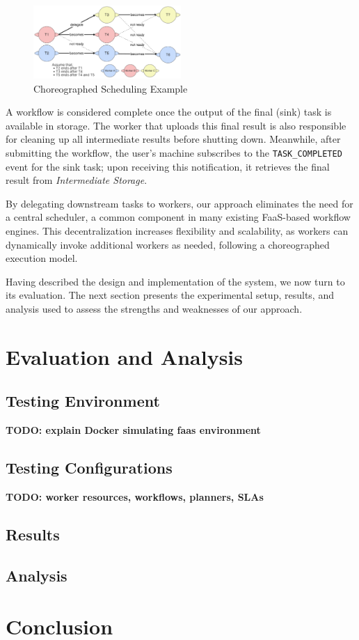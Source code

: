 \documentclass[conference]{IEEEtran}
\begin{document}
\begin{figure}[h]
    \centering
    \includegraphics[width=0.5\textwidth]{figures/choreographed_execution_example.png}
    \caption{Choreographed Scheduling Example}
    \label{fig:choreographed_scheduling_example}
\end{figure}

A workflow is considered complete once the output of the final (sink) task is available in storage. The worker that uploads this final result is also responsible for cleaning up all intermediate results before shutting down. Meanwhile, after submitting the workflow, the user's machine subscribes to the \texttt{TASK\_COMPLETED} event for the sink task; upon receiving this notification, it retrieves the final result from \textit{Intermediate Storage}.

By delegating downstream tasks to workers, our approach eliminates the need for a central scheduler, a common component in many existing FaaS-based workflow engines. This decentralization increases flexibility and scalability, as workers can dynamically invoke additional workers as needed, following a choreographed execution model.

Having described the design and implementation of the system, we now turn to its evaluation. The next section presents the experimental setup, results, and analysis used to assess the strengths and weaknesses of our approach.


\section{Evaluation and Analysis}

\subsection{Testing Environment}
\textbf{TODO: explain Docker simulating faas environment}
\subsection{Testing Configurations}
\textbf{TODO: worker resources, workflows, planners, SLAs}
\subsection{Results}
\subsection{Analysis}


\section{Conclusion}



\end{document}
